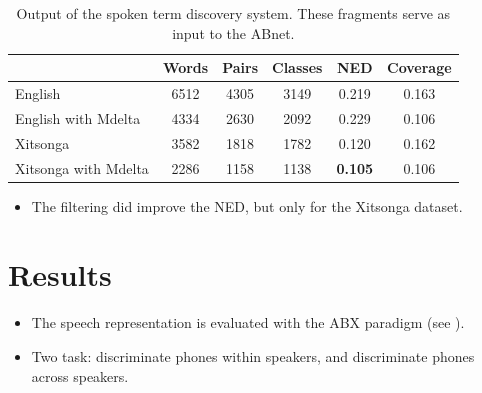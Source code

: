 \documentclass[final]{beamer}
\newcommand{\abnet}{{\sc ABnet}}
\begin{document}
\begin{frame}[t]
\begin{multicols}{3}
\begin{table}[h]
\caption{\label{tab:std-stats} Output of the spoken term discovery system. These fragments serve as input to the \abnet{}.}
\small
\begin{tabular}{lccccc}
\hline
         & Words & Pairs & Classes & NED   & Coverage \\
\hline
English & 6512 & 4305 & 3149 & 0.219 & 0.163 \\
English with Mdelta & 4334 & 2630 & 2092 & 0.229 & 0.106 \\
\hline
Xitsonga & 3582 & 1818 & 1782 & 0.120 & 0.162 \\
Xitsonga with Mdelta & 2286 & 1158 & 1138 &  \textbf{0.105} & 0.106 \\
\hline
\end{tabular}
\end{table}

\begin{itemize}
\item The filtering did improve the NED, but only for the Xitsonga dataset.
\end{itemize}






\section{Results}

\begin{itemize}
\item The speech representation is evaluated with the ABX paradigm (see \cite{versteeghetal2015}).
\item Two task: discriminate phones within speakers, and discriminate phones across speakers.


\end{itemize}
\end{multicols}
\end{frame}
\end{document}
